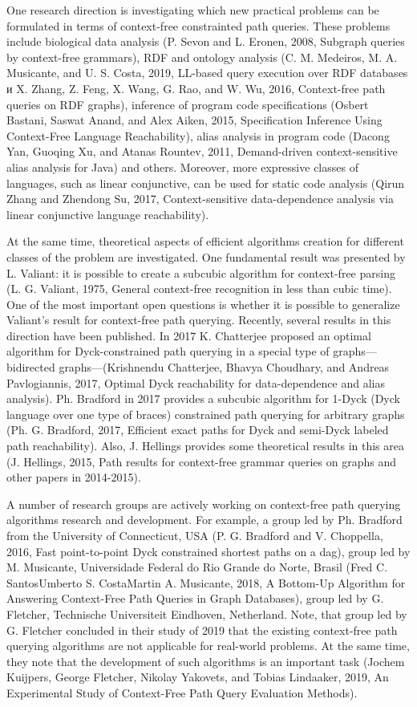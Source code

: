 \documentclass[12pt]{article}  %
\theoremstyle{remark}
\begin{document}
One research direction is investigating which new practical problems can be formulated in terms of context-free constrainted path queries.
These problems include biological data analysis (P. Sevon and L. Eronen, 2008, Subgraph queries by context-free grammars), RDF and ontology analysis (C. M. Medeiros, M. A. Musicante, and U. S. Costa, 2019, LL-based query execution over RDF databases и X. Zhang, Z. Feng, X. Wang, G. Rao, and W. Wu, 2016, Context-free path queries on RDF graphs), inference of program code specifications (Osbert Bastani, Saswat Anand, and Alex Aiken, 2015, Specification Inference Using Context-Free Language Reachability), alias analysis in program code (Dacong Yan, Guoqing Xu, and Atanas Rountev, 2011, Demand-driven context-sensitive alias analysis for Java) and others.
Moreover, more expressive classes of languages, such as linear conjunctive, can be used for static code analysis (Qirun Zhang and Zhendong Su, 2017, Context-sensitive data-dependence analysis via linear conjunctive language reachability).

At the same time, theoretical aspects of efficient algorithms creation for different classes of the problem are investigated.
One fundamental result was presented by L. Valiant: it is possible to create a subcubic algorithm for context-free parsing (L. G. Valiant, 1975, General context-free recognition in less than cubic time).
One of the most important open questions is whether it is possible to generalize Valiant's result for context-free path querying.
Recently, several results in this direction have been published.
In 2017 K. Chatterjee proposed an optimal algorithm for Dyck-constrained path querying in a special type of graphs---bidirected graphs---(Krishnendu Chatterjee, Bhavya Choudhary, and Andreas Pavlogiannis, 2017, Optimal Dyck reachability for data-dependence and alias analysis).
Ph. Bradford in 2017 provides a subcubic algorithm for 1-Dyck (Dyck language over one type of braces) constrained path querying for arbitrary graphs (Ph. G. Bradford, 2017, Efficient exact paths for Dyck and semi-Dyck labeled path reachability).
Also, J. Hellings provides some theoretical results in this area (J. Hellings, 2015, Path results for context-free grammar queries on graphs and other papers in 2014-2015).

A number of research groups are actively working on context-free path querying algorithms research and development.
For example, a group led by Ph. Bradford from the University of Connecticut, USA (P. G. Bradford and V. Choppella, 2016, Fast point-to-point Dyck constrained shortest paths on a dag), group led by M. Musicante, Universidade Federal do Rio Grande do Norte, Brasil (Fred C. SantosUmberto S. CostaMartin A. Musicante, 2018, A Bottom-Up Algorithm for Answering Context-Free Path Queries in Graph Databases), group led by G. Fletcher, Technische Universiteit Eindhoven, Netherland.
Note, that group led by G. Fletcher concluded in their study of 2019 that the existing context-free path querying algorithms are not applicable for real-world problems.
At the same time, they note that the development of such algorithms is an important task (Jochem Kuijpers, George Fletcher, Nikolay Yakovets, and Tobias Lindaaker, 2019, An Experimental Study of Context-Free Path Query Evaluation Methods).
\end{document}
